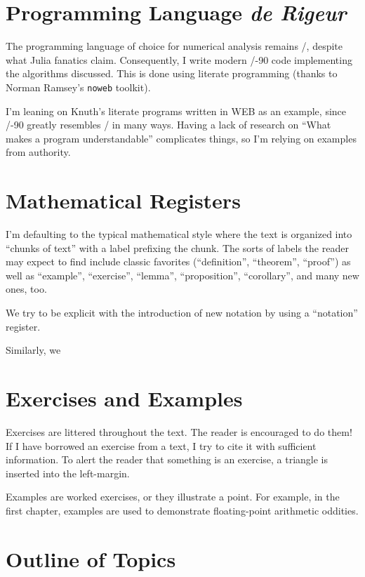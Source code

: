 \section*{Programming Language \textit{de Rigeur}}

The programming language of choice for numerical analysis remains
\FORTRAN/, despite what Julia fanatics claim. Consequently, I write
modern \FORTRAN/-90 code implementing the algorithms discussed. This is
done using literate programming (thanks to Norman Ramsey's {\tt noweb}
toolkit).

I'm leaning on Knuth's literate programs written in WEB as an example,
since \FORTRAN/-90 greatly resembles \PASCAL/ in many ways. Having a
lack of research on ``What makes a program understandable'' complicates
things, so I'm relying on examples from authority.

\section*{Mathematical Registers}

I'm defaulting to the typical mathematical style where the text is
organized into ``chunks of text'' with a label prefixing the chunk. The
sorts of labels the reader may expect to find include classic favorites
(``definition'', ``theorem'', ``proof'') as well as ``example'',
``exercise'', ``lemma'', ``proposition'', ``corollary'', and many new
ones, too.

We try to be explicit with the introduction of new notation by using a
``notation'' register.

Similarly, we

\section*{Exercises and Examples}

Exercises are littered throughout the text. The reader is encouraged to
do them! If I have borrowed an exercise from a text, I try to cite it
with sufficient information. To alert the reader that something is an
exercise, a triangle is inserted into the left-margin.

Examples are worked exercises, or they illustrate a point. For example,
in the first chapter, examples are used to demonstrate floating-point
arithmetic oddities.

\section*{Outline of Topics}

